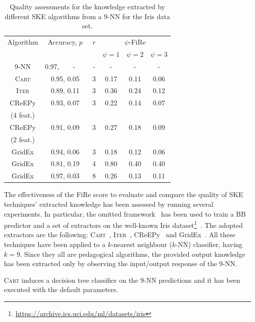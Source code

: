 \documentclass{article}
\newcommand{\psyke}{omitted}%
\newcommand{\iter}{\textsc{Iter}}
\newcommand{\gridex}{GridEx}
\newcommand{\creepy}{CReEPy}
\newcommand{\cart}{\textsc{Cart}}
\newcommand{\fire}{FiRe}
\newcommand{\psifire}{$\psi$-\fire}
\begin{document}
\begin{table}[t]\centering
	\begin{tabular}{|c|c|c|c|c|c|}
		\toprule
		Algorithm & Accuracy, $p$ & $r$ & \multicolumn{3}{c|}{\psifire{}} \\
		& & & $\psi=1$ & $\psi=2$ & $\psi=3$ \\
		\midrule\midrule
		9-NN & 0.97,~~~~-~~~ & - & - & - & - \\
		\cart{} & 0.95, 0.05 & 3 & 0.17 & 0.11 & 0.06 \\
		\iter{} & 0.89, 0.11 & 3 & 0.36 & 0.24 & 0.12 \\
		\creepy{} & 0.93, 0.07 & 3 & 0.22 & 0.14 & 0.07 \\
		(4 feat.) & & & & & \\
		\creepy{} & 0.91, 0.09 & 3 & 0.27 & 0.18 & 0.09 \\
		(2 feat.) & & & & & \\
		\gridex{} & 0.94, 0.06 & 3 & 0.18 & 0.12 & 0.06 \\
		\gridex{} & 0.81, 0.19 & 4 & 0.80 & 0.40 & 0.40 \\
		\gridex{} & 0.97, 0.03 & 8 & 0.26 & 0.13 & 0.11 \\
		\bottomrule
	\end{tabular}
	\caption{Quality assessments for the knowledge extracted by different SKE algorithms from a 9-NN for the Iris data set.}
	\label{tab:experiments}
\end{table}

The effectiveness of the \fire{} score to evaluate and compare the quality of SKE techniques' extracted knowledge has been assessed by running several experiments.
%
In particular, the \psyke{} framework~\cite{putCitations} has been used to train a BB predictor and a set of extractors on the well-known Iris dataset\footnote{\url{https://archive.ics.uci.edu/ml/datasets/iris}}~\cite{iris}.%
%
The adopted extractors are the following: \cart{}~\cite{breiman1984classification}, \iter{}~\cite{huysmans2006iter}, \creepy{}~\cite{putCitations} and \gridex{}~\cite{gridex-extraamas2021}.
%
All these techniques have been applied to a $k$-nearest neighbour ($k$-NN) classifier, having $k=9$.
%
Since they all are pedagogical algorithms, the provided output knowledge has been extracted only by observing the input/output response of the 9-NN.

\cart{} induces a decision tree classifier on the 9-NN predictions and it has been executed with the default parameters.
\end{document}
